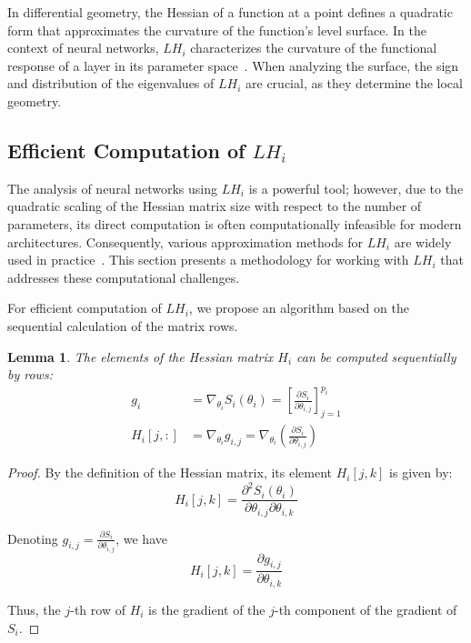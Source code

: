 \documentclass[a4paper,12pt]{article}
\newtheorem{lemma}{Lemma}
\begin{document}
In differential geometry, the Hessian of a function at a point defines a quadratic form that approximates the
curvature of the function's level surface. In the context of neural networks, $LH_i$ characterizes the
curvature of the functional response of a layer in its parameter space~\cite{dangel2019modular}. When
analyzing the surface, the sign and distribution of the eigenvalues of $LH_i$ are crucial, as they determine
the local geometry.

\subsection{Efficient Computation of $LH_i$}

The analysis of neural networks using $LH_i$ is a powerful tool; however, due to the quadratic scaling of the
Hessian matrix size with respect to the number of parameters, its direct computation is often computationally
infeasible for modern architectures. Consequently, various approximation methods for $LH_i$ are widely used
in practice~\cite{carlon2024, hare2024, martens2010, nocedal1980}. This section presents a methodology for
working with $LH_i$ that addresses these computational challenges.

For efficient computation of $LH_i$, we propose an algorithm based on the sequential calculation of the matrix rows.

\begin{lemma}
  The elements of the Hessian matrix $H_i$ can be computed sequentially by rows:
  \begin{equation}
    \begin{aligned}
      g_i &= \nabla_{\theta_i} S_i(\theta_i) = \left[ \frac{\partial S_i}{\partial \theta_{i,j}} \right]_{j=1}^{p_i} \\
      H_i[j,:] &= \nabla_{\theta_i} g_{i,j} = \nabla_{\theta_i} \left( \frac{\partial S_i}{\partial
      \theta_{i,j}} \right)
    \end{aligned}
  \end{equation}
\end{lemma}

\begin{proof}
  By the definition of the Hessian matrix, its element $H_i[j,k]$ is given by:
  \begin{equation}
    H_i[j,k] = \frac{\partial^2 S_i(\theta_i)}{\partial \theta_{i,j} \partial \theta_{i,k}}
  \end{equation}

  Denoting $g_{i,j} = \frac{\partial S_i}{\partial \theta_{i,j}}$, we have
  \begin{equation}
    H_i[j,k] = \frac{\partial g_{i,j}}{\partial \theta_{i,k}}
  \end{equation}

  Thus, the $j$-th row of $H_i$ is the gradient of the $j$-th component of the gradient of $S_i$.
\end{proof}
\end{document}
